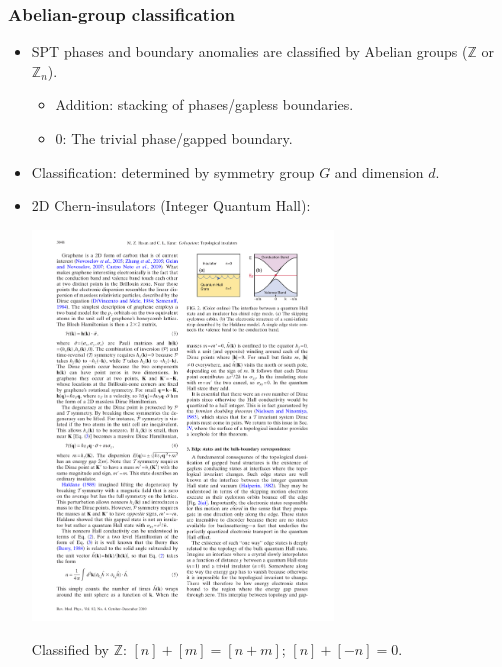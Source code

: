 \documentclass[xcolor=table, 11pt, aspectratio=169]{beamer}
\begin{document}
\begin{frame}
  \frametitle{Abelian-group classification}
  \begin{itemize}
  \item SPT phases and boundary anomalies are classified by Abelian groups ($\mathbb Z$ or $\mathbb Z_n$).
    \begin{itemize}
    \item Addition: stacking of phases/gapless boundaries.
    \item 0: The trivial phase/gapped boundary.
    \end{itemize}
  \item Classification: determined by symmetry group $G$ and dimension $d$.
  \item 2D Chern-insulators (Integer Quantum Hall):
    \begin{center}
      \includegraphics[width=8cm]{qhe_edge}
    \end{center}
    Classified by $\mathbb Z$: $[n]+[m]=[n+m]$; $[n]+[-n] = 0$.
  \end{itemize}
\end{frame}
\end{document}
